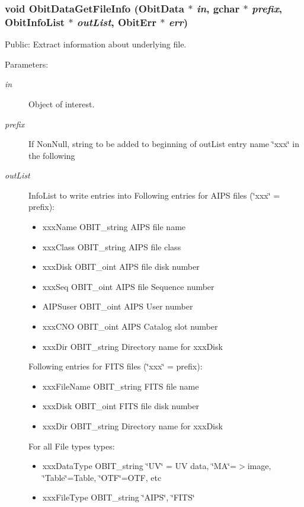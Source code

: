 \subsubsection{\setlength{\rightskip}{0pt plus 5cm}void Obit\-Data\-Get\-File\-Info ({\bf Obit\-Data} $\ast$ {\em in}, gchar $\ast$ {\em prefix}, {\bf Obit\-Info\-List} $\ast$ {\em out\-List}, {\bf Obit\-Err} $\ast$ {\em err})}\label{ObitData_8h_a49}


Public: Extract information about underlying file. 

\begin{Desc}
\item[Parameters:]
\begin{description}
\item[{\em in}]Object of interest. \item[{\em prefix}]If Non\-Null, string to be added to beginning of out\-List entry name \char`\"{}xxx\char`\"{} in the following \item[{\em out\-List}]Info\-List to write entries into Following entries for AIPS files (\char`\"{}xxx\char`\"{} = prefix): \begin{itemize}
\item xxx\-Name OBIT\_\-string AIPS file name \item xxx\-Class OBIT\_\-string AIPS file class \item xxx\-Disk OBIT\_\-oint AIPS file disk number \item xxx\-Seq OBIT\_\-oint AIPS file Sequence number \item AIPSuser OBIT\_\-oint AIPS User number \item xxx\-CNO OBIT\_\-oint AIPS Catalog slot number \item xxx\-Dir OBIT\_\-string Directory name for xxx\-Disk\end{itemize}
Following entries for FITS files (\char`\"{}xxx\char`\"{} = prefix): \begin{itemize}
\item xxx\-File\-Name OBIT\_\-string FITS file name \item xxx\-Disk OBIT\_\-oint FITS file disk number \item xxx\-Dir OBIT\_\-string Directory name for xxx\-Disk\end{itemize}
For all File types types: \begin{itemize}
\item xxx\-Data\-Type OBIT\_\-string \char`\"{}UV\char`\"{} = UV data, \char`\"{}MA\char`\"{}=$>$image, \char`\"{}Table\char`\"{}=Table, \char`\"{}OTF\char`\"{}=OTF, etc \item xxx\-File\-Type OBIT\_\-string \char`\"{}AIPS\char`\"{}, \char`\"{}FITS\char`\"{}\end{itemize}

\end{description}
\end{Desc}
